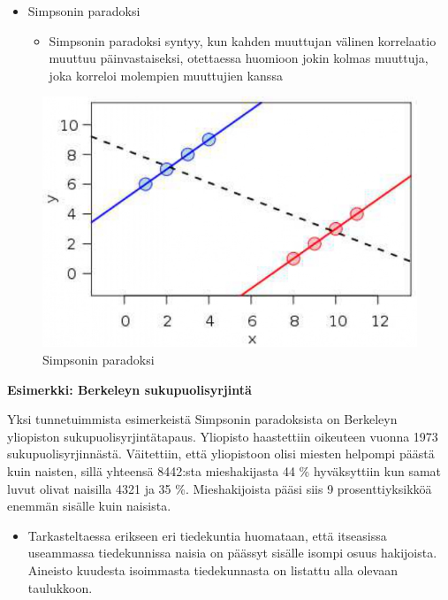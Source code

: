 \documentclass[
]{book}
\providecommand{\tightlist}{%
  \setlength{\itemsep}{0pt}\setlength{\parskip}{0pt}}
\begin{document}
\begin{itemize}
\tightlist
\item
  Simpsonin paradoksi

  \begin{itemize}
  \tightlist
  \item
    Simpsonin paradoksi syntyy, kun kahden muuttujan välinen korrelaatio muuttuu päinvastaiseksi, otettaessa huomioon jokin kolmas muuttuja, joka korreloi molempien muuttujien kanssa
  \end{itemize}
\end{itemize}

\FloatBarrier

\begin{figure}

{\centering \includegraphics[width=0.75\linewidth]{images/simpson} 

}

\caption{Simpsonin paradoksi}\label{fig:simpson}
\end{figure}

\FloatBarrier

\newpage

\begin{defblock}{}

\textbf{Esimerkki: Berkeleyn sukupuolisyrjintä}

Yksi tunnetuimmista esimerkeistä Simpsonin paradoksista on Berkeleyn yliopiston sukupuolisyrjintätapaus. Yliopisto haastettiin oikeuteen vuonna 1973 sukupuolisyrjinnästä. Väitettiin, että yliopistoon olisi miesten helpompi päästä kuin naisten, sillä yhteensä 8442:sta mieshakijasta 44 \% hyväksyttiin kun samat luvut olivat naisilla 4321 ja 35 \%. Mieshakijoista pääsi siis 9 prosenttiyksikköä enemmän sisälle kuin naisista.

\begin{itemize}
\tightlist
\item
  Tarkasteltaessa erikseen eri tiedekuntia huomataan, että itseasissa useammassa tiedekunnissa naisia on päässyt sisälle isompi osuus hakijoista. Aineisto kuudesta isoimmasta tiedekunnasta on listattu alla olevaan taulukkoon.
\end{itemize}

\end{defblock}
\end{document}
